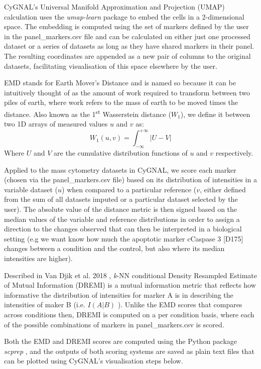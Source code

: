CyGNAL’s Universal Manifold Approximation and Projection (UMAP) calculation uses the \emph{umap-learn} package \cite{mcinnes_umap_2020} to embed the cells in a 2-dimensional space. The embedding is computed using the set of markers defined by the user in the panel\_markers.csv file and can be calculated on either just one processed dataset or a series of datasets as long as they have shared markers in their panel. The resulting coordinates are appended as a new pair of columns to the original datasets, facilitating visualisation of this space elsewhere by the user.

EMD stands for Earth Mover's Distance and is named so because it can be intuitively thought of as the amount of work required to transform between two piles of earth, where work refers to the mass of earth to be moved times the distance. Also known as the 1\textsuperscript{st} Wasserstein distance (\(W_1\)), we define it between two 1D arrays of measured values \(u\) and \(v\) as:
\[W_1(u, v) = \int_{-\infty}^{+\infty} |U-V|\]
Where \(U\) and \(V\) are the cumulative distribution functions of \(u\) and \(v\) respectively.

Applied to the mass cytometry datasets in CyGNAL, we score each marker (chosen via the panel\_markers.csv file) based on its distribution of intensities in a variable dataset (\(u\)) when compared to a particular reference (\(v\), either defined from the sum of all datasets imputed or a particular dataset selected by the user). The absolute value of the distance metric is then signed based on the median values of the variable and reference distributions in order to assign a direction to the changes observed that can then be interpreted in a biological setting (e.g we want know how much the apoptotic marker cCaspase 3 [D175] changes between a condition and the control, but also where its median intensities are higher).

Described in Van Djik et al. 2018 \cite{van_dijk_recovering_2018}, \emph{k}-NN conditional Density Resampled Estimate of Mutual Information (DREMI) is a mutual information metric that reflects how informative the distribution of intensities for marker A is in describing the intensities of maker B (i.e. \(I(A|B)\) ). Unlike the EMD scores that compares across conditions then, DREMI is computed on a per condition basis, where each of the possible combinations of markers in panel\_markers.csv is scored.

Both the EMD and DREMI scores are computed using the Python package \emph{scprep} \cite{noauthor_krishnaswamylabscprep_2021}, and the outputs of both scoring systems are saved as plain text files that can be plotted using CyGNAL’s visualisation steps below.

